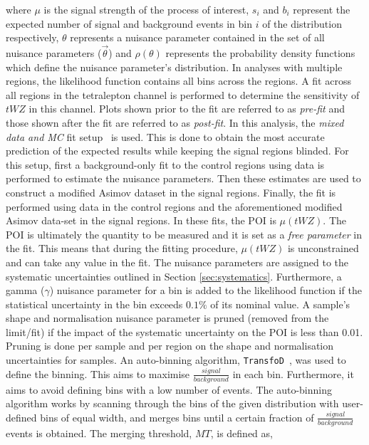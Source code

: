 where $\mu$ is the signal strength of the process of interest, $s_{i}$ and $b_{i}$ represent the expected number of signal and background events in bin $i$ of the distribution respectively, $\theta$ represents a nuisance parameter contained in the set of all nuisance parameters ($\vec{\theta}$) and $\rho(\theta)$ represents the probability density functions which define the nuisance parameter's distribution. In analyses with multiple regions, the likelihood function contains all bins across the regions. A fit across all regions in the tetralepton channel is performed to determine the sensitivity of $tWZ$ in this channel. Plots shown prior to the fit are referred to as \textit{pre-fit} and those shown after the fit are referred to as \textit{post-fit}. In this analysis, the \textit{mixed data and MC} fit setup~\cite{MixedDataAndMC_TRF} is used. This is done to obtain the most accurate prediction of the expected results while keeping the signal regions blinded. For this setup, first a background-only fit to the control regions using data is performed to estimate the nuisance parameters. Then these estimates are used to construct a modified Asimov dataset in the signal regions. Finally, the fit is performed using data in the control regions and the aforementioned modified Asimov data-set in the signal regions. In these fits, the POI is $\mu (tWZ)$. The POI is ultimately the quantity to be measured and it is set as a \textit{free parameter} in the fit. This means that during the fitting procedure, $\mu (tWZ)$ is unconstrained and can take any value in the fit. The nuisance parameters are assigned to the systematic uncertainties outlined in Section \ref{sec:systematics}. Furthermore, a gamma ($\gamma$) nuisance parameter for a bin is added to the likelihood function if the statistical uncertainty in the bin exceeds $0.1\%$ of its nominal value. A sample's shape and normalisation nuisance parameter is pruned (removed from the limit/fit) if the impact of the systematic uncertainty on the POI is less than 0.01. Pruning is done per sample and per region on the shape and normalisation uncertainties for samples. An auto-binning algorithm, \texttt{TransfoD}~\cite{transfod-autobin, Calvet:2296985}, was used to define the binning. This aims to maximise $\frac{signal}{background}$ in each bin. Furthermore, it aims to avoid defining bins with a low number of events. The auto-binning algorithm works by scanning through the bins of the given distribution with user-defined bins of equal width, and merges bins until a certain fraction of $\frac{signal}{background}$ events is obtained. The merging threshold, $MT$, is defined as,
